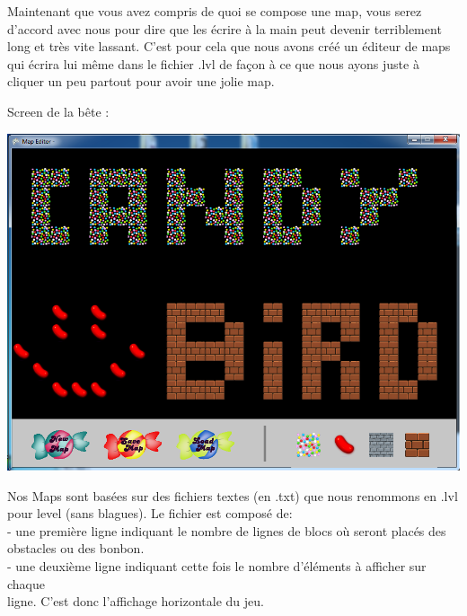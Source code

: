 \documentclass [11pt]{report}
\begin{document}
			\indent Maintenant que vous avez compris de quoi se compose une map, vous serez d'accord avec nous pour dire que les écrire à la main peut devenir terriblement long et très vite lassant. C'est pour cela que nous avons créé un éditeur de maps qui écrira lui même dans le fichier .lvl de façon à ce que nous ayons juste à cliquer un peu partout pour avoir une jolie map.
			
			\vspace{10mm}
			
	\noindent Screen de la bête : 
						
		\vspace{4mm}
		
			\begin{center}
			\includegraphics[scale = 0.4]{images/EditeurMap.png}
			\end{center}
			
			
			
		\newpage
			
			
			
			Nos Maps sont basées sur des fichiers textes (en .txt) que nous renommons en .lvl pour level (sans blagues). Le fichier est composé de:\\
						
						\indent- une première ligne indiquant le nombre de lignes de blocs où seront placés des \\\indent obstacles ou des bonbon.\\
						
						\indent- une deuxième ligne indiquant cette fois le nombre d'éléments à afficher sur chaque\\\indent ligne. C'est donc l'affichage horizontale du jeu.\\
						
\end{document}

